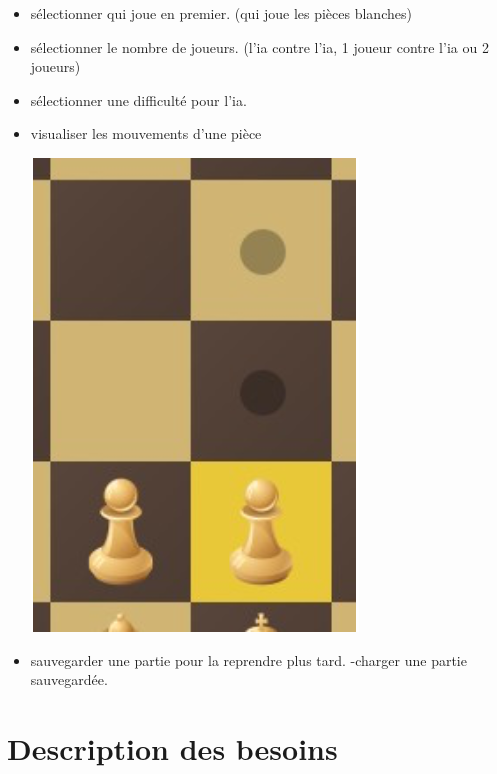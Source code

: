 \documentclass{article}
\begin{document}
\begin{itemize}
\item sélectionner qui joue en premier. (qui joue les pièces blanches)
\item sélectionner le nombre de joueurs. (l'ia contre l'ia, 1 joueur contre l'ia ou 2 joueurs)
\item sélectionner une difficulté pour l'ia.
\item visualiser les mouvements d'une pièce
\newline
\centerline{\includegraphics[scale = 0.5]{Piece_move.png}}
\item sauvegarder une partie pour la reprendre plus tard. -charger une partie sauvegardée.
\end{itemize}


\newpage
\section{Description des besoins}

\end{document}
